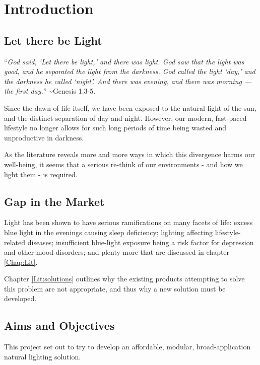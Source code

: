
\chapter{Introduction}
\label{Chap:Intro}

\setcounter{section}{-1}

\section{Let there be Light}

``\textit{God said, `Let there be light,' and there was light. God saw that the light was good, and he separated the light from the darkness. God called the light `day,' and the darkness he called `night'. And there was evening, and there was morning — the first day.}'' \textasciitilde Genesis 1:3-5.

Since the dawn of life itself, we have been exposed to the natural light of the sun, and the distinct separation of day and night. However, our modern, fast-paced lifestyle no longer allows for such long periods of time being wasted and unproductive in darkness.

As the literature reveals more and more ways in which this divergence harms our well-being, it seems that a serious re-think of our environments - and how we light them - is required.

\section{Gap in the Market}

Light has been shown to have serious ramifications on many facets of life: excess blue light in the evenings causing sleep deficiency; lighting affecting lifestyle-related diseases; insufficient blue-light exposure being a risk factor for depression and other mood disorders; and plenty more that are discussed in chapter \ref{Chap:Lit}.

Chapter \ref{Lit:solutions} outlines why the existing products attempting to solve this problem are not appropriate, and thus why a new solution must be developed. 

\section{Aims and Objectives}

This project set out to try to develop an affordable, modular, broad-application natural lighting solution. 

